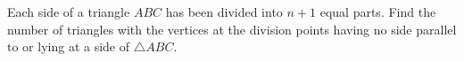 Each side of a triangle $ABC$ has been divided into $n+1$ equal parts. Find the number of triangles with the vertices at the division points having no side parallel to or lying at a side of $\triangle ABC$.